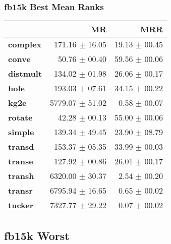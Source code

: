 \documentclass{article}
\begin{document}
\subsubsection{fb15k Best Mean Ranks}
    \begin{center}
    \begin{tabular}{lrr}
\toprule
{} &               MR &            MRR \\
\midrule
\textbf{complex } &   171.16 $\pm$ 16.05 &  19.13 $\pm$ 00.45 \\
\textbf{conve   } &    50.76 $\pm$ 00.40 &  59.56 $\pm$ 00.06 \\
\textbf{distmult} &   134.02 $\pm$ 01.98 &  26.06 $\pm$ 00.17 \\
\textbf{hole    } &   193.03 $\pm$ 07.61 &  34.15 $\pm$ 00.22 \\
\textbf{kg2e    } &  5779.07 $\pm$ 51.02 &   0.58 $\pm$ 00.07 \\
\textbf{rotate  } &    42.28 $\pm$ 00.13 &  55.00 $\pm$ 00.06 \\
\textbf{simple  } &   139.34 $\pm$ 49.45 &  23.90 $\pm$ 08.79 \\
\textbf{transd  } &   153.37 $\pm$ 05.35 &  33.99 $\pm$ 00.03 \\
\textbf{transe  } &   127.92 $\pm$ 00.86 &  26.01 $\pm$ 00.17 \\
\textbf{transh  } &  6320.00 $\pm$ 30.37 &   2.54 $\pm$ 00.20 \\
\textbf{transr  } &  6795.94 $\pm$ 16.65 &   0.65 $\pm$ 00.02 \\
\textbf{tucker  } &  7327.77 $\pm$ 29.22 &   0.07 $\pm$ 00.02 \\
\bottomrule
\end{tabular}

    \end{center}
\subsection{fb15k Worst}
\end{document}
